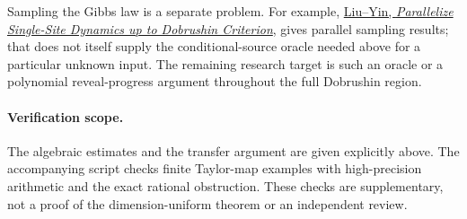 Sampling the Gibbs law is a separate problem. For example,
\href{https://arxiv.org/abs/2111.04044}{Liu--Yin, \emph{Parallelize
Single-Site Dynamics up to Dobrushin Criterion}}, gives parallel
sampling results; that does not itself supply the conditional-source
oracle needed above for a particular unknown input. The remaining
research target is such an oracle or a polynomial reveal-progress
argument throughout the full Dobrushin region.

\paragraph{Verification scope.}
The algebraic estimates and the transfer argument are given explicitly
above. The accompanying script 
checks finite Taylor-map examples with high-precision arithmetic and
the exact rational obstruction. These checks are supplementary, not
a proof of the dimension-uniform theorem or an independent review.
